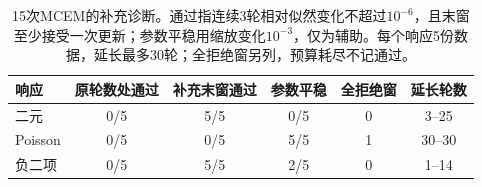 \begin{table}[H]\centering\small
\caption{15次MCEM的补充诊断。通过指连续3轮相对似然变化不超过$10^{-6}$，且末窗至少接受一次更新；参数平稳用缩放变化$10^{-3}$，仅为辅助。每个响应5份数据，延长最多30轮；全拒绝窗另列，预算耗尽不记通过。}
\begin{tabular}{lccccc}\toprule
响应 & 原轮数处通过 & 补充末窗通过 & 参数平稳 & 全拒绝窗 & 延长轮数\\\midrule
二元 & 0/5 & 5/5 & 0/5 & 0 & 3--25 \\
Poisson & 0/5 & 0/5 & 5/5 & 1 & 30--30 \\
负二项 & 0/5 & 5/5 & 2/5 & 0 & 1--14 \\
\bottomrule\end{tabular}\end{table}
